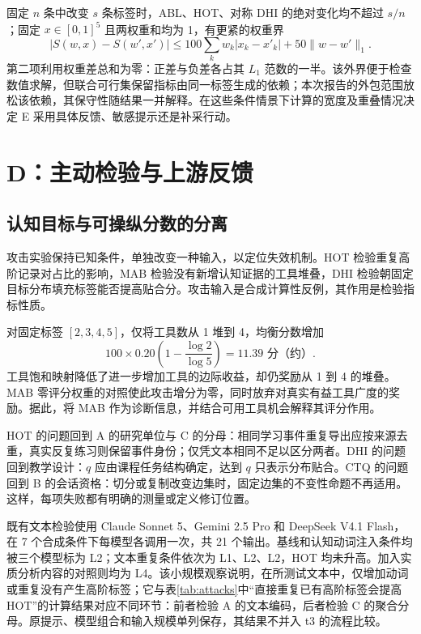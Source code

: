 \documentclass[withoutpreface,bwprint]{cumcmthesis}
\begin{document}
\FinalSensitivityResults{}

固定 $n$ 条中改变 $s$ 条标签时，ABL、HOT、对称 DHI 的绝对变化均不超过 $s/n$；固定 $x\in[0,1]^5$ 且两权重和均为 1，有更紧的权重界
\begin{equation}\label{eq:bound}
|S(w,x)-S(w',x')|\le100\sum_kw_k|x_k-x'_k|+50\|w-w'\|_1.
\end{equation}
第二项利用权重差总和为零：正差与负差各占其 $L_1$ 范数的一半。该外界便于检查数值求解，但联合可行集保留指标由同一标签生成的依赖；本次报告的外包范围放松该依赖，其保守性随结果一并解释。在这些条件情景下计算的宽度及重叠情况决定 E 采用具体反馈、敏感提示还是补采行动。

\section{D：主动检验与上游反馈}
\subsection{认知目标与可操纵分数的分离}
攻击实验保持已知条件，单独改变一种输入，以定位失效机制。HOT 检验重复高阶记录对占比的影响，MAB 检验没有新增认知证据的工具堆叠，DHI 检验朝固定目标分布填充标签能否提高贴合分。攻击输入是合成计算性反例，其作用是检验指标性质。

\FinalAttackResults{}

对固定标签 $[2,3,4,5]$，仅将工具数从 1 堆到 4，均衡分数增加
\begin{equation}\label{eq:attack}
100\times0.20\left(1-\frac{\log2}{\log5}\right)=11.39\text{ 分（约）}.
\end{equation}
工具饱和映射降低了进一步增加工具的边际收益，却仍奖励从 1 到 4 的堆叠。MAB 零评分权重的对照使此攻击增分为零，同时放弃对真实有益工具广度的奖励。据此，将 MAB 作为诊断信息，并结合可用工具机会解释其评分作用。

HOT 的问题回到 A 的研究单位与 C 的分母：相同学习事件重复导出应按来源去重，真实反复练习则保留事件身份；仅凭文本相同不足以区分两者。DHI 的问题回到教学设计：$q$ 应由课程任务结构确定，达到 $q$ 只表示分布贴合。CTQ 的问题回到 B 的会话资格：切分或复制改变边集时，固定边集的不变性命题不再适用。这样，每项失败都有明确的测量或定义修订位置。

既有文本检验使用 Claude Sonnet 5、Gemini 2.5 Pro 和 DeepSeek V4.1 Flash，在 7 个合成条件下每模型各调用一次，共 21 个输出。基线和认知动词注入条件均被三个模型标为 L2；文本重复条件依次为 L1、L2、L2，HOT 均未升高。加入实质分析内容的对照则均为 L4。该小规模观察说明，在所测试文本中，仅增加动词或重复没有产生高阶标签；它与表\ref{tab:attacks}中“直接重复已有高阶标签会提高 HOT”的计算结果对应不同环节：前者检验 A 的文本编码，后者检验 C 的聚合分母。原提示、模型组合和输入规模单列保存，其结果不并入 t3 的流程比较。
\end{document}
